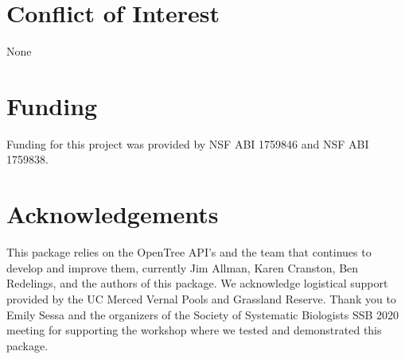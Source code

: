 \documentclass[oupdraft]{sysbio_sse}
\begin{document}
\section{Conflict of Interest}
None

\section{Funding}
Funding for this project was provided by NSF ABI 1759846 and NSF ABI 1759838. 

\section{Acknowledgements}
This package relies on the OpenTree API's and the team that continues to develop and improve them, currently Jim Allman, Karen Cranston, Ben Redelings, and the authors of this package. We acknowledge logistical support provided by the UC Merced Vernal Pools and Grassland Reserve.
Thank you to Emily Sessa and the organizers of the Society of Systematic Biologists SSB 2020 meeting for supporting the workshop where we tested and demonstrated this package. 


\bigskip\bigskip

\end{document}
